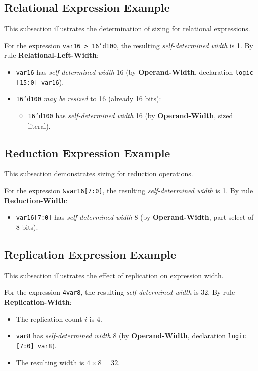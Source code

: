 \documentclass{article}
\newcommand{\sv}[1]{{\color{black}\texttt{#1}}}
\newcommand{\sds}{\emph{self-determined width}}
\newcommand{\mbr}{\emph{may be resized}}
\begin{document}
{\subsection{Relational Expression Example}

This subsection illustrates the determination of sizing for relational
expressions.

For the expression \sv{var16 > 16'd100}, the resulting \sds{} is 1.
By rule \textbf{Relational-Left-Width}:
\begin{itemize}
  \item \sv{var16} has \sds{} 16 (by \textbf{Operand-Width},
    declaration \sv{logic [15:0] var16}).
  \item \sv{16'd100} \mbr{} to 16 (already 16 bits):
    \begin{itemize}
      \item \sv{16'd100} has \sds{} 16 (by
        \textbf{Operand-Width}, sized literal).
    \end{itemize}
\end{itemize}

\subsection{Reduction Expression Example}

This subsection demonstrates sizing for reduction operations.

For the expression \sv{&var16[7:0]}, the resulting \sds{} is 1.
By rule \textbf{Reduction-Width}:
\begin{itemize}
  \item \sv{var16[7:0]} has \sds{} 8 (by
    \textbf{Operand-Width}, part-select of 8 bits).
\end{itemize}

\subsection{Replication Expression Example}

This subsection illustrates the effect of replication on expression
width.

For the expression \sv{{4{var8}}}, the resulting \sds{} is 32.
By rule \textbf{Replication-Width}:
\begin{itemize}
  \item The replication count $i$ is 4.
  \item \sv{var8} has \sds{} 8 (by \textbf{Operand-Width},
    declaration \sv{logic [7:0] var8}).
  \item The resulting width is $4 \times 8 = 32$.
\end{itemize}

}
\end{document}

